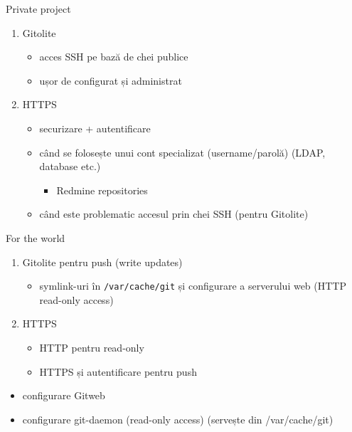 \documentclass{beamer}
\begin{document}
\begin{frame}{Private project}
  \begin{enumerate}
    \item Gitolite
      \begin{itemize}
        \item acces SSH pe bază de chei publice
        \item ușor de configurat și administrat
      \end{itemize}
    \item HTTPS
      \begin{itemize}
        \item securizare + autentificare
        \item când se folosește unui cont specializat (username/parolă) (LDAP,
        database etc.)
          \begin{itemize}
            \item Redmine repositories
          \end{itemize}
        \item când este problematic accesul prin chei SSH (pentru Gitolite)
      \end{itemize}
  \end{enumerate}
\end{frame}

\begin{frame}{For the world}
	\begin{enumerate}
		\item Gitolite pentru push (write updates)
          \begin{itemize}
    		\item symlink-uri în \texttt{/var/cache/git} și configurare a
            serverului web (HTTP read-only access)
          \end{itemize}
        \item HTTPS
          \begin{itemize}
            \item HTTP pentru read-only
            \item HTTPS și autentificare pentru push
          \end{itemize}
    \end{enumerate}
    \begin{itemize}
        \item configurare Gitweb
        \item configurare git-daemon (read-only access) (servește din
        /var/cache/git)
	\end{itemize}
\end{frame}
\end{document}
